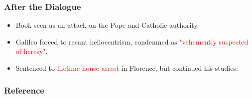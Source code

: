 \documentclass[aspectratio=1611, 9pt]{beamer}
\begin{document}
\begin{frame}
  \frametitle{After the Dialogue}
  \begin{center}
    \begin{itemize}
      \item Book seen as an attack on the Pope and Catholic authority.
      \item Galileo forced to recant heliocentrism, condemned as \textcolor{red}{"vehemently suspected of heresy"}.
      \item Sentenced to \textcolor{red}{lifetime house arrest} in Florence, but continued his studies.
    \end{itemize}
  \end{center}
\end{frame}

\begin{frame}
  \frametitle{Reference}
\end{frame}
\end{document}
